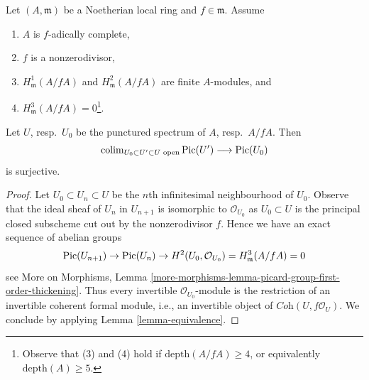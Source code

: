 \begin{lemma}
\label{lemma-surjective-Pic-first}
Let $(A, \mathfrak m)$ be a Noetherian local ring and $f \in \mathfrak m$.
Assume
\begin{enumerate}
\item $A$ is $f$-adically complete,
\item $f$ is a nonzerodivisor,
\item $H^1_\mathfrak m(A/fA)$ and $H^2_\mathfrak m(A/fA)$
are finite $A$-modules, and
\item $H^3_\mathfrak m(A/fA) = 0$\footnote{Observe that (3) and (4) hold
if $\text{depth}(A/fA) \geq 4$, or equivalently $\text{depth}(A) \geq 5$.}.
\end{enumerate}
Let $U$, resp.\ $U_0$ be the punctured spectrum of $A$, resp.\ $A/fA$.
Then
$$
\mathop{\mathrm{colim}}\nolimits_{U_0 \subset U' \subset U\text{ open}} \mathop{\mathrm{Pic}}\nolimits(U')
\longrightarrow
\mathop{\mathrm{Pic}}\nolimits(U_0)
$$
is surjective.
\end{lemma}

\begin{proof}
Let $U_0 \subset U_n \subset U$ be the $n$th infinitesimal neighbourhood
of $U_0$. Observe that the ideal sheaf of $U_n$ in $U_{n + 1}$ is
isomorphic to $\mathcal{O}_{U_0}$ as $U_0 \subset U$ is the principal
closed subscheme cut out by the nonzerodivisor $f$. Hence we have
an exact sequence of abelian groups
$$
\mathop{\mathrm{Pic}}\nolimits(U_{n + 1}) \to \mathop{\mathrm{Pic}}\nolimits(U_n) \to
H^2(U_0, \mathcal{O}_{U_0}) = H^3_\mathfrak m(A/fA) = 0
$$
see More on Morphisms, Lemma
\ref{more-morphisms-lemma-picard-group-first-order-thickening}.
Thus every invertible $\mathcal{O}_{U_0}$-module is the restriction
of an invertible coherent formal module, i.e., an invertible object of
$\textit{Coh}(U, f\mathcal{O}_U)$. We conclude by applying
Lemma \ref{lemma-equivalence}.
\end{proof}

